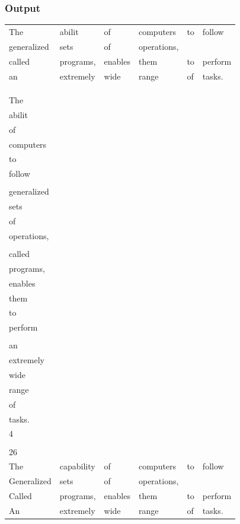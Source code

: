 \documentclass[11pt]{article}
\begin{document}
\subsubsection*{Output}
\label{sec-1-4-2}
\begin{center}
\begin{tabular}{llllll}
The & abilit & of & computers & to & follow\\
generalized & sets & of & operations, &  & \\
called & programs, & enables & them & to & perform\\
an & extremely & wide & range & of & tasks.\\
 &  &  &  &  & \\
 &  &  &  &  & \\
 &  &  &  &  & \\
The &  &  &  &  & \\
abilit &  &  &  &  & \\
of &  &  &  &  & \\
computers &  &  &  &  & \\
to &  &  &  &  & \\
follow &  &  &  &  & \\
 &  &  &  &  & \\
generalized &  &  &  &  & \\
sets &  &  &  &  & \\
of &  &  &  &  & \\
operations, &  &  &  &  & \\
 &  &  &  &  & \\
called &  &  &  &  & \\
programs, &  &  &  &  & \\
enables &  &  &  &  & \\
them &  &  &  &  & \\
to &  &  &  &  & \\
perform &  &  &  &  & \\
 &  &  &  &  & \\
an &  &  &  &  & \\
extremely &  &  &  &  & \\
wide &  &  &  &  & \\
range &  &  &  &  & \\
of &  &  &  &  & \\
tasks. &  &  &  &  & \\
4 &  &  &  &  & \\
 &  &  &  &  & \\
26 &  &  &  &  & \\
The & capability & of & computers & to & follow\\
Generalized & sets & of & operations, &  & \\
Called & programs, & enables & them & to & perform\\
An & extremely & wide & range & of & tasks.\\
\end{tabular}
\end{center}
\end{document}
